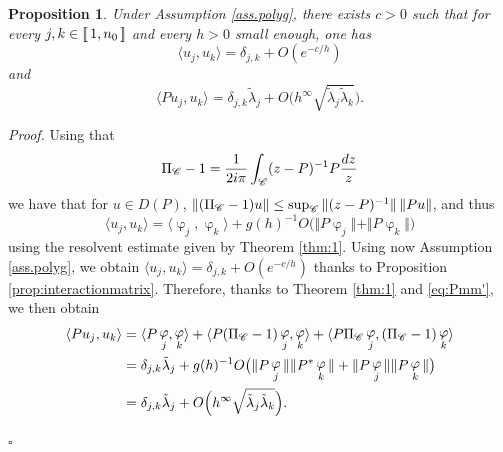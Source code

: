 \documentclass[12pt]{amsart}
\def\<{\langle}
\def\>{\rangle}
\newcommand{\bp}{{\it Proof. }}
\newcommand{\ep}{\hfill $\square$}
\numberwithin{equation}{section}
\numberwithin{figure}{section}
\DeclareMathOperator{\phii}{\varphi}
\newcommand{\vvert}[1]{\left\lVert#1\right\rVert}
\newcommand{\lb}{\operatorname{[\negthinspace [}}
\newcommand{\rb}{\operatorname{]\negthinspace ]}}
\newtheorem{proposition}[defin]{Proposition}
\begin{document}
\begin{proposition}
    Under Assumption \ref{ass.polyg}, there exists $c>0$ such that for every $j,k\in\lb1,n_0\rb$ and every $h>0$ small enough, one has
    \begin{equation}\label{eq:quasiortho}
    \<u_j,u_k\> = \delta_{j,k} + O(e^{-c/h})
    \end{equation}
    and
    \begin{equation}\label{eq:interaction}
    \<Pu_j,u_k\> = \delta_{j,k}\tilde{\lambda}_j + O\Big(h^\infty\sqrt{\tilde{\lambda}_j\tilde{\lambda}_k}\Big).
    \end{equation}
\end{proposition}

\bp Using that
\begin{equation*}
\Pi_{\mathscr C}-1 = \frac{1}{2i\pi}\int_{{\mathscr C}}(z-P)^{-1}P\frac{dz}{z}
\end{equation*}
we have that for $u\in D(P)$, $\vvert{(\Pi_\Cr-1)u}\leq\sup_{\Cr}\Vert(z-P)^{-1}\Vert\vvert{Pu}$, and thus
\begin{equation*}
\<u_j,u_k\> = \<\phii_j,\phii_k\> + g(h)^{-1}O\big(\Vert P\phii_j\Vert + \Vert P\phii_k\Vert\big)
\end{equation*}
using the resolvent estimate given by Theorem \ref{thm:1}. Using now Assumption \ref{ass.polyg}, we obtain $\<u_j,u_k\> = \delta_{j,k} + O(e^{-c/h})$ thanks to Proposition \ref{prop:interactionmatrix}. Therefore, thanks to Theorem \ref{thm:1} and \eqref{eq:Pmm'}, we then %
obtain
\begin{equation*}
\begin{aligned}
    \<Pu_j,u_k\> &= \<P\phii_j,\phii_k\> + \<P(\Pi_\Cr-1)\phii_j,\phii_k\> + \<P\Pi_\Cr\phii_j,(\Pi_\Cr-1)\phii_k\>\\
    &= \delta_{j,k}\tilde{\lambda}_j + g(h)^{-1}O\big(\Vert P\phii_j\Vert\Vert P^*\phii_k\Vert + \Vert P\phii_j\Vert\Vert P\phii_k\Vert\big)\\
    &= \delta_{j,k}\tilde{\lambda}_j + O\Big(h^\infty\sqrt{\tilde{\lambda}_{j}\tilde{\lambda}_{k}}\Big).
\end{aligned}
\end{equation*}

\ep
\end{document}

